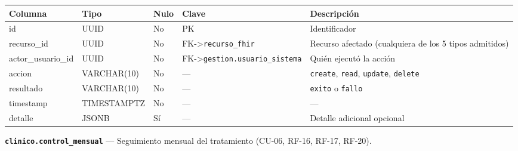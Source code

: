\documentclass[11pt,a4paper]{article}
\begin{document}
{\small
\begin{longtable}[]{@{}
  >{\raggedright\arraybackslash}p{}
  >{\raggedright\arraybackslash}p{}
  >{\raggedright\arraybackslash}p{}
  >{\raggedright\arraybackslash}p{}
  >{\raggedright\arraybackslash}p{}@{}}
\toprule\noalign{}
\begin{minipage}[b]{\linewidth}\raggedright
Columna
\end{minipage} & \begin{minipage}[b]{\linewidth}\raggedright
Tipo
\end{minipage} & \begin{minipage}[b]{\linewidth}\raggedright
Nulo
\end{minipage} & \begin{minipage}[b]{\linewidth}\raggedright
Clave
\end{minipage} & \begin{minipage}[b]{\linewidth}\raggedright
Descripción
\end{minipage} \\
\midrule\noalign{}
\endhead
\bottomrule\noalign{}
\endlastfoot
id & UUID & No & PK & Identificador \\
recurso\_id & UUID & No & FK-\textgreater{}\texttt{recurso\_fhir} & Recurso afectado (cualquiera de los 5 tipos admitidos) \\
actor\_usuario\_id & UUID & No & FK-\textgreater{}\texttt{gestion.usuario\_sistema} & Quién ejecutó la acción \\
accion & VARCHAR(10) & No & --- & \texttt{create}, \texttt{read}, \texttt{update}, \texttt{delete} \\
resultado & VARCHAR(10) & No & --- & \texttt{exito} o \texttt{fallo} \\
timestamp & TIMESTAMPTZ & No & --- & --- \\
detalle & JSONB & Sí & --- & Detalle adicional opcional \\
\end{longtable}
}

\textbf{\texttt{clinico.control\_mensual}} --- Seguimiento mensual del tratamiento (CU-06, RF-16, RF-17, RF-20).
\end{document}
